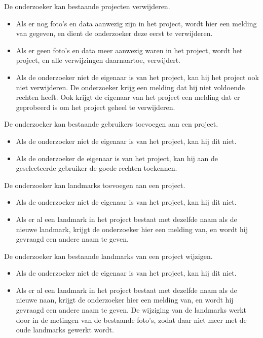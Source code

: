 De onderzoeker kan bestaande projecten verwijderen.
\begin{itemize}
	\item Als er nog foto's en data aanwezig zijn in het project, wordt hier een melding van gegeven, en dient de onderzoeker deze eerst te verwijderen.
	\item Als er geen foto's en data meer aanwezig waren in het project, wordt het project, en alle verwijzingen daarnaartoe, verwijdert.
	\item Als de onderzoeker niet de eigenaar is van het project, kan hij het project ook niet verwijderen. De onderzoeker krijg een melding dat hij niet voldoende rechten heeft. Ook krijgt de eigenaar van het project een melding dat er geprobeerd is om het project geheel te verwijderen.
\end{itemize}

De onderzoeker kan bestaande gebruikers toevoegen aan een project.
\begin{itemize}
	\item Als de onderzoeker niet de eigenaar is van het project, kan hij dit niet.
	\item Als de onderzoeker de eigenaar is van het project, kan hij aan de geselecteerde gebruiker de goede rechten toekennen.
\end{itemize}

De onderzoeker kan landmarks toevoegen aan een project.
\begin{itemize}
	\item Als de onderzoeker niet de eigenaar is van het project, kan hij dit niet.
	\item Als er al een landmark in het project bestaat met dezelfde naam als de nieuwe landmark, krijgt de onderzoeker hier een melding van, en wordt hij gevraagd een andere naam te geven.
\end{itemize}

De onderzoeker kan bestaande landmarks van een project wijzigen.
\begin{itemize}
	\item Als de onderzoeker niet de eigenaar is van het project, kan hij dit niet.
	\item Als er al een landmark in het project bestaat met dezelfde naam als de nieuwe naan, krijgt de onderzoeker hier een melding van, en wordt hij gevraagd een andere naam te geven. De wijziging van de landmarks werkt door in de metingen van de bestaande foto's, zodat daar niet meer met de oude landmarks gewerkt wordt.
\end{itemize}

